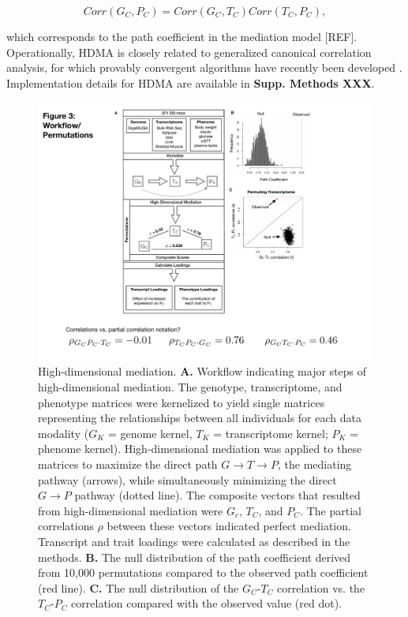 \documentclass[
]{article}
\begin{document}
\begin{equation*}
Corr(G_C,P_C) = Corr(G_C,T_C)Corr(T_C,P_C),
\end{equation*}

which corresponds to the path coefficient in the mediation model
{[}REF{]}. Operationally, HDMA is closely related to generalized
canonical correlation analysis, for which provably convergent algorithms
have recently been developed \cite{rgcca}. Implementation details for
HDMA are available in \textbf{Supp. Methods XXX}.

\begin{figure}[ht!]
\includegraphics[width=5in]{Figures/Fig3_workflow.pdf} 
\caption{High-dimensional mediation. \textbf{A.} Workflow indicating 
major steps of high-dimensional mediation. The genotype, transcriptome, 
and phenotype matrices were kernelized to yield single matrices representing 
the relationships between all individuals for each data modality ($G_K$ = 
genome kernel, $T_K$ = transcriptome kernel; $P_K$ = phenome kernel). High-dimensional 
mediation was applied to these matrices to maximize the direct path 
$G \rightarrow T \rightarrow P$, the mediating pathway (arrows), while 
simultaneously minimizing the direct $G \rightarrow P$ pathway (dotted line). 
The composite vectors that resulted from high-dimensional mediation were 
$G_c$, $T_C$, and $P_C$. The partial correlations $\rho$ between these vectors 
indicated perfect mediation. Transcript and trait loadings were calculated 
as described in the methods. \textbf{B.} The null distribution of the path 
coefficient derived from 10,000 permutations compared to the observed path 
coefficient (red line). \textbf{C.} The null distribution of the $G_C$-$T_C$ 
correlation vs. the $T_C$-$P_C$ correlation compared with the observed value 
(red dot).
}
\label{fig:workflow}
\end{figure}
\end{document}
